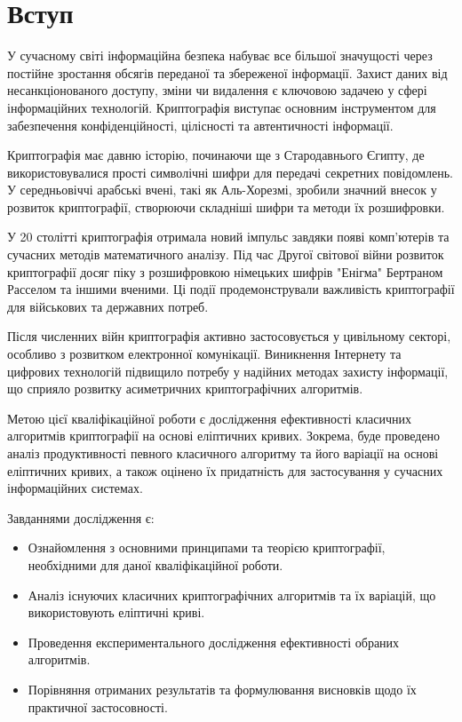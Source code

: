 \documentclass[12pt]{report}
\theoremstyle{definition}
\theoremstyle{plain}
\begin{document}
\tableofcontents

\chapter*{Вступ}

У сучасному світі інформаційна безпека набуває все більшої значущості через постійне зростання обсягів переданої та збереженої інформації. Захист даних від несанкціонованого доступу, зміни чи видалення є ключовою задачею у сфері інформаційних технологій. Криптографія виступає основним інструментом для забезпечення конфіденційності, цілісності та автентичності інформації.


Криптографія має давню історію, починаючи ще з Стародавнього Єгипту, де використовувалися прості символічні шифри для передачі секретних повідомлень. У середньовіччі арабські вчені, такі як Аль-Хорезмі, зробили значний внесок у розвиток криптографії, створюючи складніші шифри та методи їх розшифровки.

У 20 столітті криптографія отримала новий імпульс завдяки появі комп'ютерів та сучасних методів математичного аналізу. Під час Другої світової війни розвиток криптографії досяг піку з розшифровкою німецьких шифрів "Енігма"  Бертраном Расселом та іншими вченими. Ці події продемонстрували важливість криптографії для військових та державних потреб.

Після численних війн криптографія активно застосовується у цивільному секторі, особливо з розвитком електронної комунікації. Виникнення Інтернету та цифрових технологій підвищило потребу у надійних методах захисту інформації, що сприяло розвитку асиметричних криптографічних алгоритмів.

Метою цієї кваліфікаційної роботи є дослідження ефективності класичних алгоритмів криптографії на основі еліптичних кривих. Зокрема, буде проведено аналіз продуктивності певного класичного алгоритму та його варіації на основі еліптичних кривих, а також оцінено їх придатність для застосування у сучасних інформаційних системах.

Завданнями дослідження є:

\begin{itemize}
    \item Ознайомлення з основними принципами та теорією криптографії, необхідними для даної кваліфікаційної роботи.
    \item Аналіз існуючих класичних криптографічних алгоритмів та їх варіацій, що використовують еліптичні криві.
    \item Проведення експериментального дослідження ефективності обраних алгоритмів.
    \item Порівняння отриманих результатів та формулювання висновків щодо їх практичної застосовності.
\end{itemize}
\end{document}
